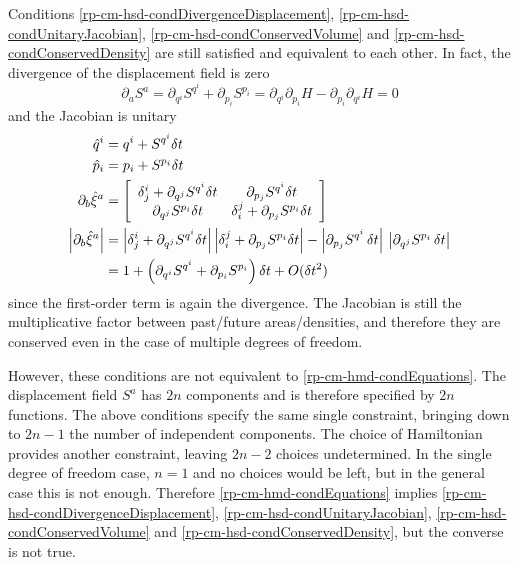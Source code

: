 Conditions \ref{rp-cm-hsd-condDivergenceDisplacement}, \ref{rp-cm-hsd-condUnitaryJacobian}, \ref{rp-cm-hsd-condConservedVolume} and \ref{rp-cm-hsd-condConservedDensity} are still satisfied and equivalent to each other. In fact, the divergence of the displacement field is zero
\begin{equation}
	\partial_a S^a = \partial_{q^i} S^{q^i} + \partial_{p_i} S^{p_i} = \partial_{q^i} \partial_{p_i} H - \partial_{p_i} \partial_{q^i} H = 0
\end{equation}
and the Jacobian is unitary
\begin{equation}
	\begin{aligned}
		\hat{q}^i &= q^i + S^{q^i} \delta t \\ 
		\hat{p}_i &= p_i + S^{p_i} \delta t \\ 
		\partial_{b} \hat{\xi}^a &= \left[\begin{array}{ c c }
			\delta_j^i + \partial_{q^j} S^{q^i} \delta t & \partial_{p_j} S^{q^i} \delta t \\
			\partial_{q^j} S^{p_i} \delta t & \delta_i^j + \partial_{p_j} S^{p_i} \delta t \\
		\end{array} \right] \\
		\left|\partial_{b} \hat{\xi}^a\right| &= \left|\delta_j^i + \partial_{q^j} S^{q^i} \delta t\right| \left|\delta_i^j + \partial_{p_j} S^{p_i} \delta t\right| - \left|\partial_{p_j} S^{q^i} \, \delta t \right| \, \left| \partial_{q^j} S^{p_i} \, \delta t \right| \\
		&= 1 + \left(\partial_{q^i} S^{q^i} + \partial_{p_i} S^{p_i} \right) \delta t + O(\delta t^2)
	\end{aligned}
\end{equation}
since the first-order term is again the divergence. The Jacobian is still the multiplicative factor between past/future areas/densities, and therefore they are conserved even in the case of multiple degrees of freedom.

However, these conditions are not equivalent to \ref{rp-cm-hmd-condEquations}. The displacement field $S^a$ has $2n$ components and is therefore specified by $2n$ functions. The above conditions specify the same single constraint, bringing down to $2n -1$ the number of independent components. The choice of Hamiltonian provides another constraint, leaving $2n - 2$ choices undetermined. In the single degree of freedom case, $n=1$ and no choices would be left, but in the general case this is not enough. Therefore \ref{rp-cm-hmd-condEquations} implies \ref{rp-cm-hsd-condDivergenceDisplacement}, \ref{rp-cm-hsd-condUnitaryJacobian}, \ref{rp-cm-hsd-condConservedVolume} and \ref{rp-cm-hsd-condConservedDensity}, but the converse is not true.


